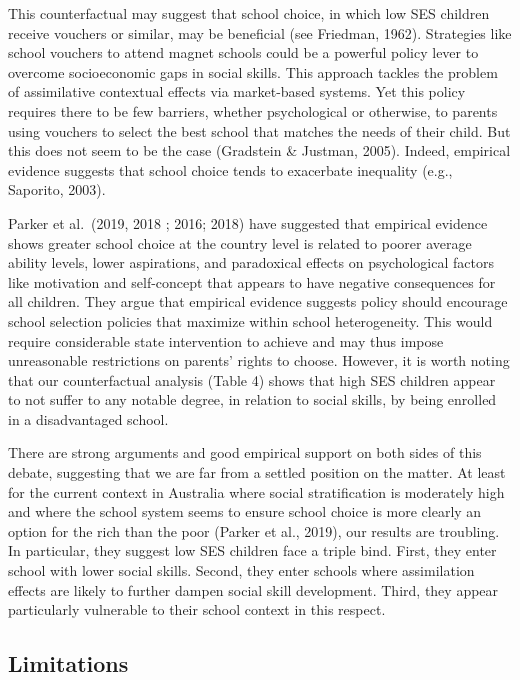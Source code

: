 \documentclass[
  english,
  man]{apa6}
\begin{document}
This counterfactual may suggest that school choice, in which low SES children receive vouchers or similar, may be beneficial (see Friedman, 1962). Strategies like school vouchers to attend magnet schools could be a powerful policy lever to overcome socioeconomic gaps in social skills. This approach tackles the problem of assimilative contextual effects via market-based systems. Yet this policy requires there to be few barriers, whether psychological or otherwise, to parents using vouchers to select the best school that matches the needs of their child. But this does not seem to be the case (Gradstein \& Justman, 2005). Indeed, empirical evidence suggests that school choice tends to exacerbate inequality (e.g., Saporito, 2003).

Parker et al.~(2019, 2018 ; 2016; 2018) have suggested that empirical evidence shows greater school choice at the country level is related to poorer average ability levels, lower aspirations, and paradoxical effects on psychological factors like motivation and self-concept that appears to have negative consequences for all children. They argue that empirical evidence suggests policy should encourage school selection policies that maximize within school heterogeneity. This would require considerable state intervention to achieve and may thus impose unreasonable restrictions on parents' rights to choose. However, it is worth noting that our counterfactual analysis (Table 4) shows that high SES children appear to not suffer to any notable degree, in relation to social skills, by being enrolled in a disadvantaged school.

There are strong arguments and good empirical support on both sides of this debate, suggesting that we are far from a settled position on the matter. At least for the current context in Australia where social stratification is moderately high and where the school system seems to ensure school choice is more clearly an option for the rich than the poor (Parker et al., 2019), our results are troubling. In particular, they suggest low SES children face a triple bind. First, they enter school with lower social skills. Second, they enter schools where assimilation effects are likely to further dampen social skill development. Third, they appear particularly vulnerable to their school context in this respect.

\hypertarget{limitations}{%
\subsection{Limitations}\label{limitations}}
\end{document}
